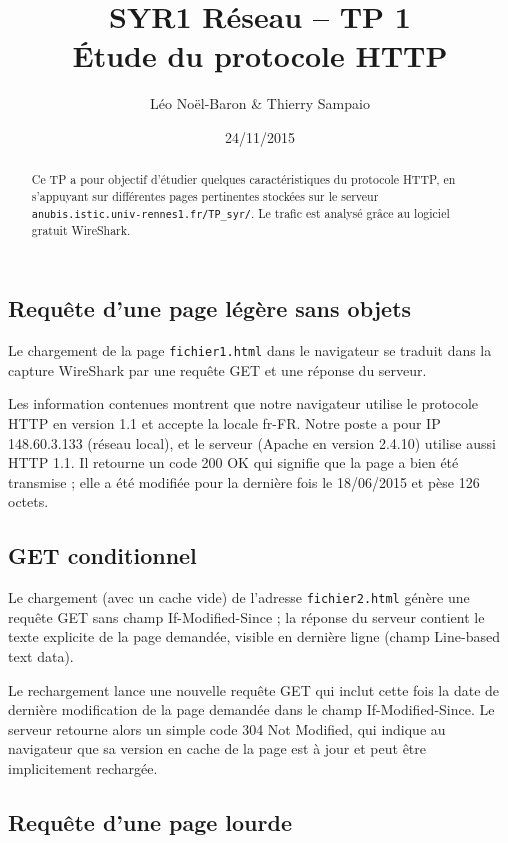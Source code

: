\documentclass[a4paper]{article}
\title{SYR1 Réseau -- TP 1\\ \'Etude du protocole HTTP}
\author{Léo Noël-Baron \& Thierry Sampaio}
\date{24/11/2015}
\begin{document}
\maketitle

\begin{abstract}
Ce TP a pour objectif d'étudier quelques caractéristiques du protocole HTTP, en s'appuyant sur différentes pages pertinentes stockées sur le serveur \verb?anubis.istic.univ-rennes1.fr/TP_syr/?. Le trafic est analysé grâce au logiciel gratuit WireShark.
\end{abstract}

\subsection*{Requête d'une page légère sans objets}

Le chargement de la page \verb?fichier1.html? dans le navigateur se traduit dans la capture WireShark par une requête GET et une réponse du serveur.

Les information contenues montrent que notre navigateur utilise le protocole HTTP en version 1.1 et accepte la locale fr-FR. Notre poste a pour IP 148.60.3.133 (réseau local), et le serveur (Apache en version 2.4.10) utilise aussi HTTP 1.1. Il retourne un code 200 OK qui signifie que la page a bien été transmise ; elle a été modifiée pour la dernière fois le 18/06/2015 et pèse 126 octets.

\subsection*{GET conditionnel}

Le chargement (avec un cache vide) de l'adresse \verb?fichier2.html? génère une requête GET sans champ If-Modified-Since ; la réponse du serveur contient le texte explicite de la page demandée, visible en dernière ligne (champ Line-based text data).

Le rechargement lance une nouvelle requête GET qui inclut cette fois la date de dernière modification de la page demandée dans le champ If-Modified-Since. Le serveur retourne alors un simple code 304 Not Modified, qui indique au navigateur que sa version en cache de la page est à jour et peut être implicitement rechargée.

\subsection*{Requête d'une page lourde}
\end{document}
